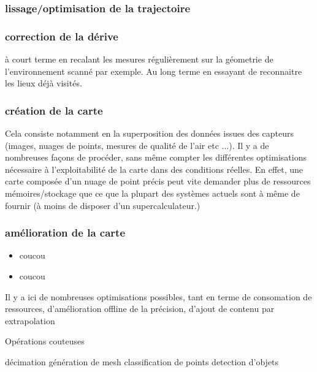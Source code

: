 \documentclass[twoside,twocolumn]{article}
\begin{document}
\subsubsection{lissage/optimisation de la trajectoire}
\subsubsection{correction de la dérive}
à court terme en recalant les mesures régulièrement sur la géometrie de
l'environnement scanné par exemple.
Au long terme en essayant de reconnaitre les lieux déjà visités.
\subsubsection{création de la carte}
Cela consiste notamment en la superposition des données issues des capteurs
(images, nuages de points, mesures de qualité de l'air etc ...).
Il y a de nombreuses façons de procéder, sans même compter les différentes
optimisations nécessaire à l'exploitabilité de la carte dans des conditions
réelles. En effet, une carte composée d'un nuage de point précis peut vite
demander plus de ressources mémoires/stockage que ce que la plupart des
systèmes actuels sont à même de fournir (à moins de disposer d'un supercalculateur.)

\subsubsection{amélioration de la carte}
\begin{itemize}
 \item coucou
 \item coucou
\end{itemize}
\cite{choset_topological_2001}
Il y a ici de nombreuses optimisations possibles, tant en terme de consomation de ressources,
d'amélioration offline de la précision, d'ajout de contenu par extrapolation

Opérations couteuses

décimation
génération de mesh
classification de points
detection d'objets
\printbibliography
\end{document}

